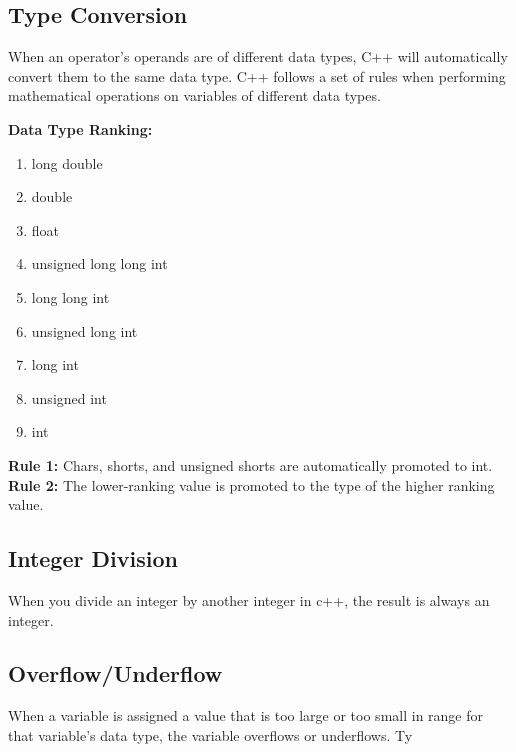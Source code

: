 \documentclass{report}
\begin{document}
    \subsection{Type Conversion}
    \begin{concept}
 When an operator's operands are of different data types, C++ will automatically convert them to the same data type. C++ follows a set of rules when performing mathematical operations on variables of different data types.
	\end{concept}
    \bigbreak \noindent 
    \textbf{Data Type Ranking:}
    \begin{enumerate}
        \item long double
        \item double 
        \item float
        \item unsigned long long int
        \item long long int
        \item unsigned long int
        \item long int
        \item unsigned int
        \item int
    \end{enumerate}
    \bigbreak \noindent 
    \textbf{Rule 1:} Chars, shorts, and unsigned shorts are automatically promoted to int.
    \bigbreak \noindent 
    \textbf{Rule 2:} The lower-ranking value is promoted to the type of the higher ranking value.


    \bigbreak \noindent
    \subsection{Integer Division}
    \bigbreak \noindent 
    \begin{concept}
 When you divide an integer by another integer in c++, the result is always an integer.
	\end{concept}

    \bigbreak \noindent 
    \subsection{Overflow/Underflow}
    \bigbreak \noindent 
    \begin{concept}
 When a variable is assigned a value that is too large or too small in range for that variable's data type, the variable overflows or underflows. Ty
	\end{concept}
    \bigbreak \noindent 
    
\end{document}
